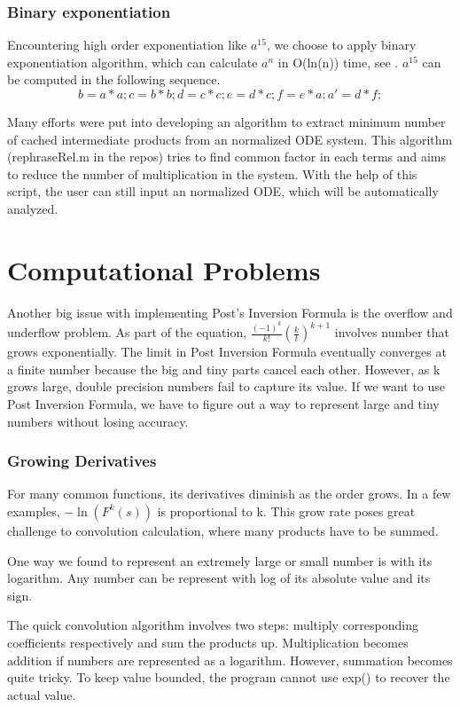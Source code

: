 \documentclass[12pt]{article}
\begin{document}
\subsubsection{Binary exponentiation}
Encountering high order exponentiation like $a^{15}$, we choose to apply binary exponentiation algorithm, which can calculate $a^{n}$ in O(ln(n)) time, see \cite{BE}. $a^{15}$ can be computed in the following sequence.
\begin{equation}
b = a * a;
c = b * b;
d = c * c;
e = d * c;
f = e * a;
a' = d * f;
\end{equation}

Many efforts were put into developing an algorithm to extract minimum number of cached intermediate products from an normalized ODE system. This algorithm (rephraseRel.m in the repos) tries to find common factor in each terms and aims to reduce the number of multiplication in the system. With the help of this script, the user can still input an normalized ODE, which will be automatically analyzed.


\section{Computational Problems}
Another big issue with implementing Post's Inversion Formula is the overflow and underflow problem. As part of the equation, $\frac{(-1)^{k}}{k!} (\frac{k}{t})^{k+1}$ involves number that grows exponentially. The limit in Post Inversion Formula eventually converges at a finite number because the big and tiny parts cancel each other. However, as k grows large, double precision numbers fail to capture its value.
If we want to use Post Inversion Formula, we have to figure out a way to represent large and tiny numbers without losing accuracy.

\subsubsection{Growing Derivatives}
For many common functions, its derivatives diminish as the order grows. 
In a few examples, $-\ln(F^{k}(s))$ is proportional to k. This grow rate poses great challenge to convolution calculation, where many products have to be summed.

One way we found to represent an extremely large or small number is with its logarithm. Any number can be represent with log of its absolute value and its sign.

The quick convolution algorithm involves two steps: multiply corresponding coefficients respectively and sum the products up. Multiplication becomes addition if numbers are represented as a logarithm. However, summation becomes quite tricky. To keep value bounded, the program cannot use exp() to recover the actual value.
\end{document}

